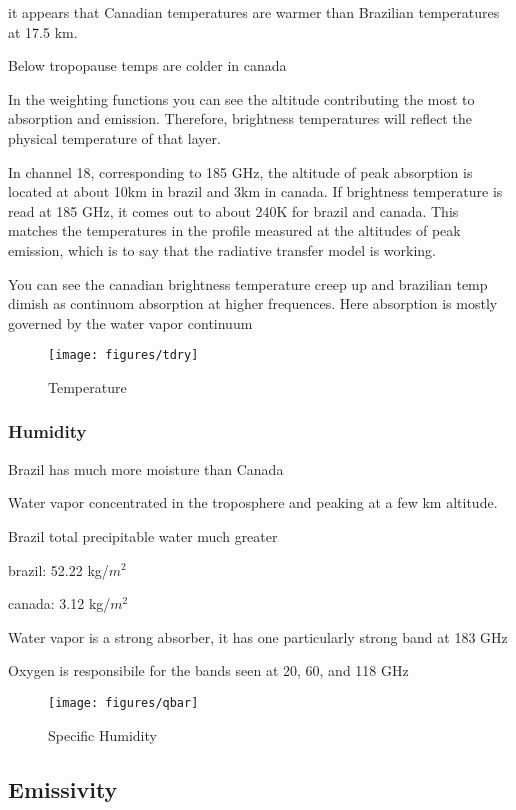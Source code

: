 \documentclass[twocol]{ametsoc}
\begin{document}
it appears that Canadian temperatures are warmer than Brazilian temperatures at 17.5 km.

Below tropopause temps are colder in canada

In the weighting functions you can see the altitude contributing the most to absorption and emission. Therefore, brightness temperatures will reflect the physical temperature of that layer.

In channel 18, corresponding to 185 GHz, the altitude of peak absorption is located at about 10km in brazil and 3km in canada. If brightness temperature is read at 185 GHz, it comes out to about 240K for brazil and canada. This matches the temperatures in the profile measured at the altitudes of peak emission, which is to say that the radiative transfer model is working.

You can see the canadian brightness temperature creep up and brazilian temp dimish as continuom absorption at higher frequences. Here absorption is mostly governed by the water vapor continuum


\begin{figure}
	\centering
	\texttt{[image: figures/tdry]}
	\caption{Temperature}
	\label{fig:tdry}
\end{figure}

\subsubsection{Humidity}

Brazil has much more moisture than Canada

Water vapor concentrated in the troposphere and peaking at a few km altitude.

Brazil total precipitable water much greater

brazil: 52.22 kg/$m^2$

canada: 3.12 kg/$m^2$

Water vapor is a strong absorber, it has one particularly strong band at 183 GHz

Oxygen is responsibile for the bands seen at 20, 60, and 118 GHz

\begin{figure}
	\centering
	\texttt{[image: figures/qbar]}
	\caption{Specific Humidity}
	\label{fig:qbar}
\end{figure}

\subsection{Emissivity}
\end{document}
